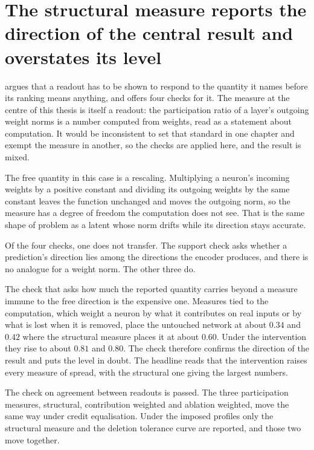 \section{The structural measure reports the direction of the central result and overstates its level}
\label{sec:disc_standard}

 argues that a readout has to be shown to respond to the
quantity it names before its ranking means anything, and offers four checks
for it. The measure at the centre of this thesis is itself a readout: the
participation ratio of a layer's outgoing weight norms is a number computed
from weights, read as a statement about computation. It would be inconsistent
to set that standard in one chapter and exempt the measure in another, so the
checks are applied here, and the result is mixed.

The free quantity in this case is a rescaling. Multiplying a neuron's incoming
weights by a positive constant and dividing its outgoing weights by the same
constant leaves the function unchanged and moves the outgoing norm, so the
measure has a degree of freedom the computation does not see. That is the same
shape of problem as a latent whose norm drifts while its direction stays
accurate.

Of the four checks, one does not transfer. The support check asks whether a
prediction's direction lies among the directions the encoder produces, and
there is no analogue for a weight norm. The other three do.

The check that asks how much the reported quantity carries beyond a measure
immune to the free direction is the expensive one. Measures tied to the
computation, which weight a neuron by what it contributes on real inputs or by
what is lost when it is removed, place the untouched network at about $0.34$
and $0.42$ where the structural measure places it at about $0.60$. Under the intervention they rise to about $0.81$ and $0.80$. The check
therefore confirms the direction of the result and puts the level in doubt.
The headline reads that the intervention raises every measure of
spread, with the structural one giving the largest numbers.

The check on agreement between readouts is passed. The three participation
measures, structural, contribution weighted and ablation weighted, move the
same way under credit equalisation. Under the imposed profiles only the
structural measure and the deletion tolerance curve are reported, and those
two move together.

